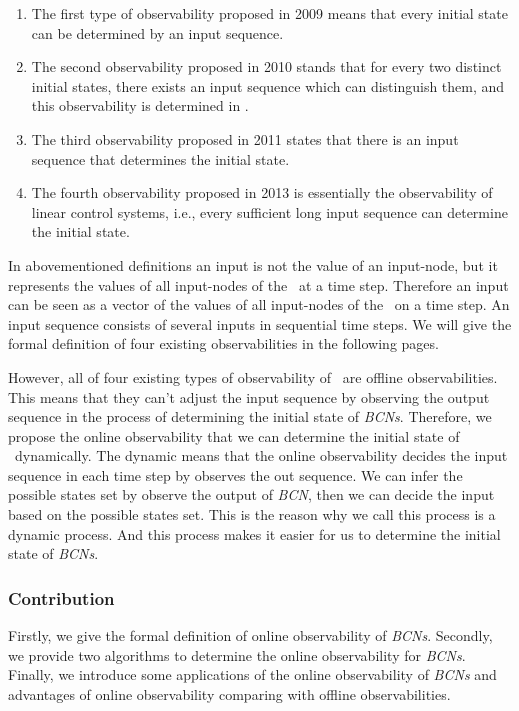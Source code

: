 \begin{enumerate}
	\item The first type of observability proposed in 2009 \cite{cheng2009controllability} means that every initial state can be determined by an input sequence.
	
	\item 
	The second observability proposed in 2010 \cite{Zhao2010Input} stands that for every two distinct initial states, there exists an input sequence which can distinguish them, and this observability is determined in \cite{Li2015Controllability}.
	
	\item The third observability proposed in 2011 \cite{Cheng2011Identification} states that there is an input sequence that determines the initial state.
	
	\item  The fourth observability proposed in 2013 \cite{Fornasini2013Observability} is essentially the observability of linear control systems, i.e., every sufficient long input sequence can determine the initial state.
\end{enumerate}
 


In abovementioned definitions an input is not the value of an input-node, but it represents the values of all input-nodes of the \BCN\ at a time step. Therefore an input can be seen as a vector of the values of all input-nodes of the \BCN\ on a time step. An input sequence consists of several inputs in sequential time steps. We will give the formal definition of four existing observabilities in the following pages.
 
 However, all of four existing types of observability of \BCNs\ are offline observabilities. This means that they can't adjust the input sequence by observing the output sequence in the process of determining the initial state of {\em BCNs}. Therefore, we propose the online observability that we can determine the initial state of \BCNs\ dynamically. The dynamic means that the online observability decides the input sequence in each time step by observes the out sequence. We can infer the possible states set by observe the output of {\em BCN}, then we can decide the input based on the possible states set. This is the reason why we call this process is a dynamic process. And this process makes it easier for us to determine the initial state of {\em BCNs}.
\subsubsection*{Contribution}
Firstly, we give the formal definition of online observability of {\em BCNs}. Secondly, we provide two algorithms to determine the online observability for {\em BCNs}. Finally, we introduce some applications of the online observability of {\em BCNs} and advantages of online observability comparing with offline observabilities. %
